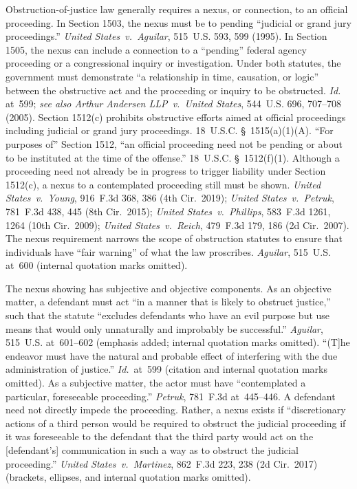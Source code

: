 Obstruction-of-justice law generally requires a nexus, or connection, to an official proceeding.
In Section 1503, the nexus must be to pending ``judicial or grand jury proceedings.''
\textit{United States~v.\ Aguilar}, 515~U.S. 593, 599 (1995).
In Section 1505, the nexus can include a connection to a ``pending'' federal agency proceeding or a congressional inquiry or investigation.
Under both statutes, the government must demonstrate ``a relationship in time, causation, or logic'' between the obstructive act and the proceeding or inquiry to be obstructed.
\textit{Id.} at~599; \textit{see also Arthur Andersen LLP~v.\ United States}, 544~U.S. 696, 707--708 (2005).
Section 1512(c) prohibits obstructive efforts aimed at official proceedings including judicial or grand jury proceedings.
18~U.S.C. \S~1515(a)(1)(A).
``For purposes of'' Section 1512, ``an official proceeding need not be pending or about to be instituted at the time of the offense.''
18~U.S.C. \S~1512(f)(1).
Although a proceeding need not already be in progress to trigger liability under Section 1512(c), a nexus to a contemplated proceeding still must be shown.
\textit{United States~v.\ Young}, 916~F.3d 368, 386 (4th Cir.~2019);
\textit{United States~v.\ Petruk}, 781~F.3d 438, 445 (8th Cir.~2015);
\textit{United States~v.\ Phillips}, 583~F.3d 1261, 1264 (10th Cir.~2009);
\textit{United States~v.\ Reich}, 479~F.3d 179, 186 (2d Cir.~2007).
The nexus requirement narrows the scope of obstruction statutes to ensure that individuals have ``fair warning'' of what the law proscribes.
\textit{Aguilar}, 515~U.S. at~600 (internal quotation marks omitted).

The nexus showing has subjective and objective components.
As an objective matter, a defendant must act ``in a manner that is likely to obstruct justice,'' such that the statute ``excludes defendants who have an evil purpose but use means that would only unnaturally and improbably be successful.''
\textit{Aguilar}, 515~U.S. at~601--602 (emphasis added; internal quotation marks omitted).
``(T]he endeavor must have the natural and probable effect of interfering with the due administration of justice.''
\textit{Id.}~at~599 (citation and internal quotation marks omitted).
As a subjective matter, the actor must have ``contemplated a particular, foreseeable proceeding.''
\textit{Petruk}, 781~F.3d at~445--446.
A defendant need not directly impede the proceeding.
Rather, a nexus exists if ``discretionary actions of a third person would be required to obstruct the judicial proceeding if it was foreseeable to the defendant that the third party would act on the [defendant's] communication in such a way as to obstruct the judicial proceeding.''
\textit{United States~v.\ Martinez}, 862~F.3d 223, 238 (2d Cir.~2017) (brackets, ellipses, and internal quotation marks omitted).

